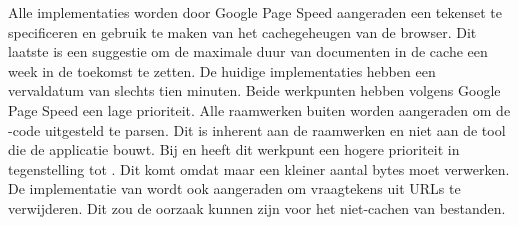 Alle implementaties worden door Google Page Speed aangeraden een tekenset te specificeren en gebruik te maken van het cachegeheugen van de browser.
Dit laatste is een suggestie om de maximale duur van documenten in de cache een week in de toekomst te zetten.
De huidige implementaties hebben een vervaldatum van slechts tien minuten.
Beide werkpunten hebben volgens Google Page Speed een lage prioriteit.
Alle raamwerken buiten \st{} worden aangeraden om de \js-code uitgesteld te parsen.
Dit is inherent aan de raamwerken en niet aan de tool die de applicatie bouwt.
Bij \kendo{} en \jqm{} heeft dit werkpunt een hogere prioriteit in tegenstelling tot \lungo{}.
Dit komt omdat \lungo{} maar een kleiner aantal bytes moet verwerken.
De implementatie van \st{} wordt ook aangeraden om vraagtekens uit URLs te verwijderen.
Dit zou de oorzaak kunnen zijn voor het niet-cachen van bestanden.
